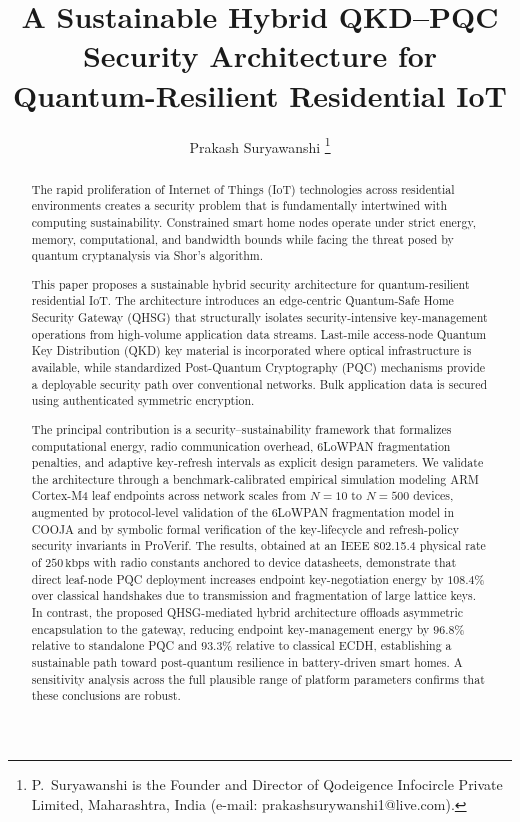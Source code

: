 \documentclass[journal]{IEEEtran}
\begin{document}
\title{A Sustainable Hybrid QKD--PQC Security Architecture for
Quantum-Resilient Residential IoT}

\author{Prakash Suryawanshi%
\thanks{P.~Suryawanshi is the Founder and Director of Qodeigence Infocircle
Private Limited, Maharashtra, India (e-mail: prakashsurywanshi1@live.com).}}

\maketitle

\begin{abstract}
The rapid proliferation of Internet of Things (IoT) technologies across residential
environments creates a security problem that is fundamentally intertwined with computing
sustainability. Constrained smart home nodes operate under strict energy, memory,
computational, and bandwidth bounds while facing the threat posed by quantum
cryptanalysis via Shor's algorithm. 

This paper proposes a sustainable hybrid security architecture for quantum-resilient
residential IoT. The architecture introduces an edge-centric Quantum-Safe Home Security
Gateway (QHSG) that structurally isolates security-intensive key-management operations
from high-volume application data streams. Last-mile access-node Quantum Key Distribution
(QKD) key material is incorporated where optical infrastructure is available, while
standardized Post-Quantum Cryptography (PQC) mechanisms provide a deployable security
path over conventional networks. Bulk application data is secured using authenticated
symmetric encryption.

The principal contribution is a security--sustainability framework that formalizes
computational energy, radio communication overhead, 6LoWPAN fragmentation penalties,
and adaptive key-refresh intervals as explicit design parameters. We validate the
architecture through a benchmark-calibrated empirical simulation modeling ARM Cortex-M4
leaf endpoints across network scales from $N=10$ to $N=500$ devices, augmented by
protocol-level validation of the 6LoWPAN fragmentation model in COOJA and by
symbolic formal verification of the key-lifecycle and refresh-policy security
invariants in ProVerif. The results, obtained at an IEEE 802.15.4 physical rate of $250\,\text{kbps}$ with
radio constants anchored to device datasheets, demonstrate that direct leaf-node PQC
deployment increases endpoint key-negotiation energy by $108.4\%$ over classical handshakes
due to transmission and fragmentation of large lattice keys. In contrast, the proposed
QHSG-mediated hybrid architecture offloads asymmetric encapsulation to the gateway,
reducing endpoint key-management energy by $96.8\%$ relative to standalone PQC and
$93.3\%$ relative to classical ECDH, establishing a sustainable path toward post-quantum
resilience in battery-driven smart homes. A sensitivity analysis across the full
plausible range of platform parameters confirms that these conclusions are robust.
\end{abstract}
\end{document}
